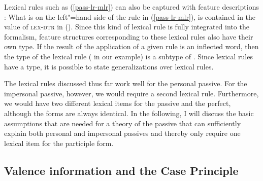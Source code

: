 Lexical rules such as (\ref{pass-lr-mlr}) can also be captured with feature descriptions \citep{Meurers2001a}:\label{pageref-lr-mit-dtr}
\ea
\label{passiv-lr-mit-dtr}
\z
What is on the left"=hand side of the rule in (\ref{pass-lr-mlr}), is contained in the value of \textsc{lex-dtr} in ().
Since this kind of lexical rule is fully integrated into the formalism, feature structures corresponding to these lexical rules also have their own
type. If the result of the application of a given rule is an inflected word, then the type of the lexical rule ( in our example)
is a subtype of . Since lexical rules have a type, it is possible to state generalizations over lexical rules.

The lexical rules discussed thus far work well for the personal passive. For the impersonal passive,
however, we would require a second lexical rule. Furthermore, we would have two different lexical
items for the passive and the perfect, although the forms are always identical.  In the following,
I will discuss the basic assumptions that are needed for a theory of the passive that can sufficiently
explain both personal and impersonal passives and thereby only require one lexical item for the
participle form.

\subsection{Valence information and the Case Principle}

